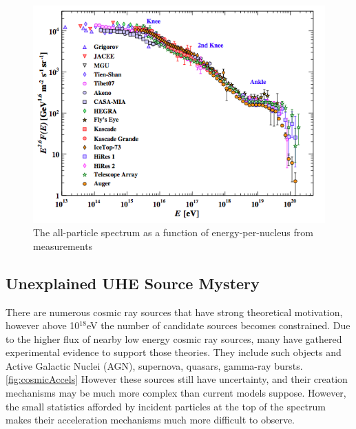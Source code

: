 \noindent		
\begin{figure}
\label{fig:cosmicrayflux}
	\includegraphics[width=\textwidth]{figures/CosmicRayFluxMeasurements}
	\caption{The all-particle spectrum as a function of energy-per-nucleus from measurements\cite{Olive:2016xmw}}
\end{figure}
		
		
		
	\subsection{Unexplained UHE Source Mystery}
		There are numerous cosmic ray sources that have strong theoretical motivation, however above 10$^{18}$eV the number of candidate sources becomes constrained.\cite{RevModPhys.71.S33}  Due to the higher flux of nearby low energy cosmic ray sources, many have gathered experimental evidence to support those theories.  They include such objects and Active Galactic Nuclei (AGN), supernova, quasars, gamma-ray bursts.\ref{fig:cosmicAccels}  However these sources still have uncertainty, and their creation mechanisms may be much more complex than current models suppose.  However, the small statistics afforded by incident particles at the top of the spectrum makes their acceleration mechanisms much more difficult to observe.

